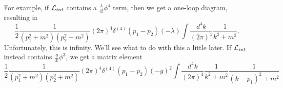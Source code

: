 For example, if $\mathcal L_{int}$ contains a $\frac{\lambda}{4!}\phi^4$ term, then we get a one-loop diagram, resulting in 
\begin{equation}
    \frac{1}{2} \frac{1}{(p_1^2+m^2)(p_2^2 +m^2)} (2\pi)^4 \delta^{(4)}(p_1-p_2)(-\lambda) \int \frac{d^4k}{(2\pi)^4} \frac{1}{k^2+m^2}.
\end{equation}
Unfortunately, this is infinity. We'll see what to do with this a little later. If $\mathcal L_{int}$ instead contains $\frac{g}{3!}\phi^3$, we get a matrix element
\begin{equation}
    \frac{1}{2} \frac{1}{(p_1^2+m^2)(p_2^2+m^2)} (2\pi)^4 \delta^{(4)}(p_1-p_2)(-g)^2 \int \frac{d^4k}{(2\pi)^4} \frac{1}{k^2+m^2} \frac{1}{(k-p_1)^2 +m^2}
\end{equation}